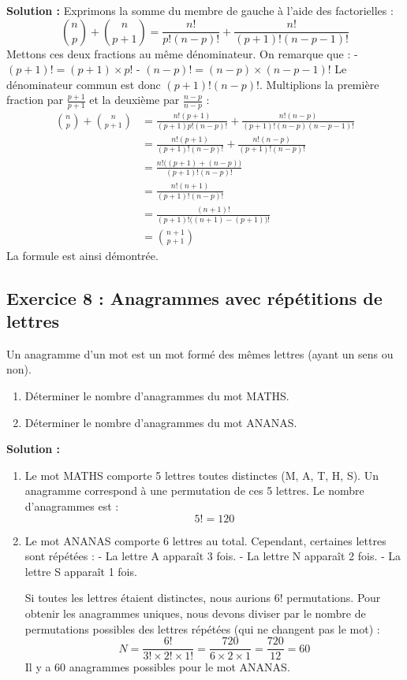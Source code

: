 \textbf{Solution :}
Exprimons la somme du membre de gauche à l'aide des factorielles :
\[
\binom{n}{p} + \binom{n}{p+1} = \frac{n!}{p!(n-p)!} + \frac{n!}{(p+1)!(n-p-1)!}
\]
Mettons ces deux fractions au même dénominateur. On remarque que :
- $(p+1)! = (p+1) \times p!$
- $(n-p)! = (n-p) \times (n-p-1)!$
Le dénominateur commun est donc $(p+1)!(n-p)!$. Multiplions la première fraction par $\frac{p+1}{p+1}$ et la deuxième par $\frac{n-p}{n-p}$ :
\[
\begin{aligned}
\binom{n}{p} + \binom{n}{p+1} &= \frac{n!(p+1)}{(p+1)p!(n-p)!} + \frac{n!(n-p)}{(p+1)!(n-p)(n-p-1)!} \\
&= \frac{n!(p+1)}{(p+1)!(n-p)!} + \frac{n!(n-p)}{(p+1)!(n-p)!} \\
&= \frac{n!\big( (p+1) + (n-p) \big)}{(p+1)!(n-p)!} \\
&= \frac{n!(n+1)}{(p+1)!(n-p)!} \\
&= \frac{(n+1)!}{(p+1)!\big( (n+1) - (p+1) \big)!} \\
&= \binom{n+1}{p+1}
\end{aligned}
\]
La formule est ainsi démontrée.

\subsection*{Exercice 8 : Anagrammes avec répétitions de lettres}
Un anagramme d'un mot est un mot formé des mêmes lettres (ayant un sens ou non).
\begin{enumerate}
    \item Déterminer le nombre d'anagrammes du mot MATHS.
    \item Déterminer le nombre d'anagrammes du mot ANANAS.
\end{enumerate}

\textbf{Solution :}
\begin{enumerate}
    \item Le mot MATHS comporte 5 lettres toutes distinctes (M, A, T, H, S). Un anagramme correspond à une permutation de ces 5 lettres. Le nombre d'anagrammes est :
    \[
    5! = 120
    \]
    
    \item Le mot ANANAS comporte 6 lettres au total. Cependant, certaines lettres sont répétées :
    - La lettre A apparaît 3 fois.
    - La lettre N apparaît 2 fois.
    - La lettre S apparaît 1 fois.
    
    Si toutes les lettres étaient distinctes, nous aurions $6!$ permutations. Pour obtenir les anagrammes uniques, nous devons diviser par le nombre de permutations possibles des lettres répétées (qui ne changent pas le mot) :
    \[
    N = \frac{6!}{3! \times 2! \times 1!} = \frac{720}{6 \times 2 \times 1} = \frac{720}{12} = 60
    \]
    Il y a 60 anagrammes possibles pour le mot ANANAS.
\end{enumerate}

